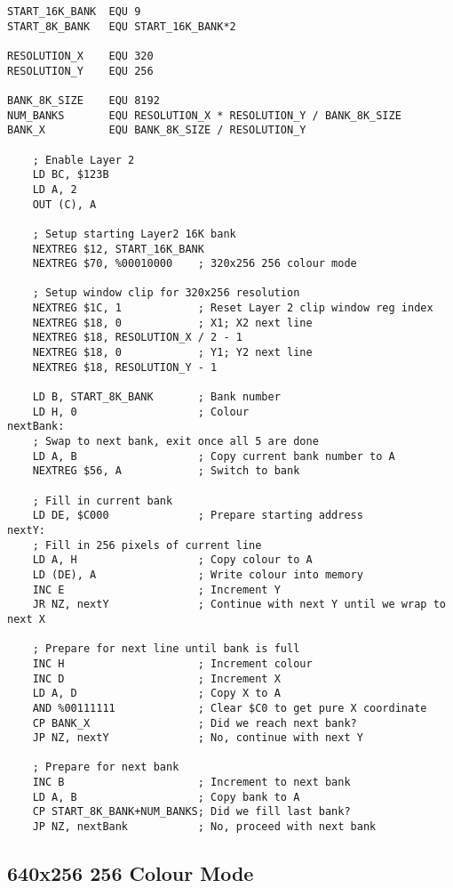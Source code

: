 \documentclass[12pt,twoside,openright,a4paper]{book}
\begin{document}
\begin{Verbatim}
START_16K_BANK  EQU 9
START_8K_BANK   EQU START_16K_BANK*2

RESOLUTION_X    EQU 320
RESOLUTION_Y    EQU 256

BANK_8K_SIZE    EQU 8192
NUM_BANKS       EQU RESOLUTION_X * RESOLUTION_Y / BANK_8K_SIZE
BANK_X          EQU BANK_8K_SIZE / RESOLUTION_Y

	; Enable Layer 2
	LD BC, $123B
	LD A, 2
	OUT (C), A

	; Setup starting Layer2 16K bank
	NEXTREG $12, START_16K_BANK
	NEXTREG $70, %00010000    ; 320x256 256 colour mode

	; Setup window clip for 320x256 resolution
	NEXTREG $1C, 1            ; Reset Layer 2 clip window reg index
	NEXTREG $18, 0            ; X1; X2 next line
	NEXTREG $18, RESOLUTION_X / 2 - 1
	NEXTREG $18, 0            ; Y1; Y2 next line
	NEXTREG $18, RESOLUTION_Y - 1

	LD B, START_8K_BANK       ; Bank number
	LD H, 0                   ; Colour
nextBank:
	; Swap to next bank, exit once all 5 are done
	LD A, B                   ; Copy current bank number to A
	NEXTREG $56, A            ; Switch to bank

	; Fill in current bank
	LD DE, $C000              ; Prepare starting address
nextY:
	; Fill in 256 pixels of current line
	LD A, H                   ; Copy colour to A
	LD (DE), A                ; Write colour into memory
	INC E                     ; Increment Y
	JR NZ, nextY              ; Continue with next Y until we wrap to next X

	; Prepare for next line until bank is full
	INC H                     ; Increment colour
	INC D                     ; Increment X
	LD A, D                   ; Copy X to A
	AND %00111111             ; Clear $C0 to get pure X coordinate
	CP BANK_X                 ; Did we reach next bank?
	JP NZ, nextY              ; No, continue with next Y

	; Prepare for next bank
	INC B                     ; Increment to next bank
	LD A, B                   ; Copy bank to A
	CP START_8K_BANK+NUM_BANKS; Did we fill last bank?
	JP NZ, nextBank           ; No, proceed with next bank
\end{Verbatim}


\subsection{640x256 256 Colour Mode}
\end{document}
